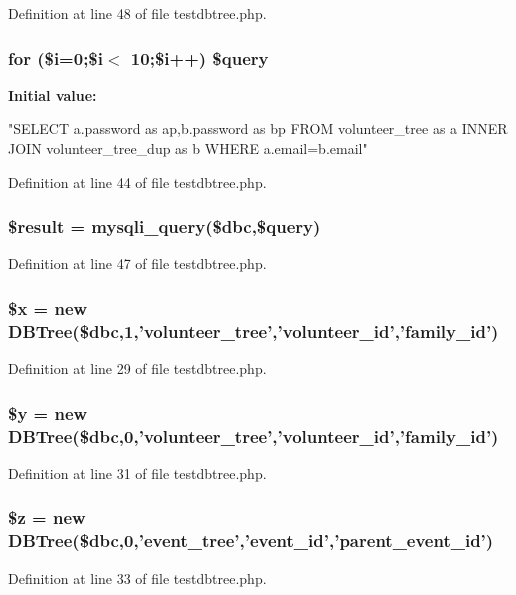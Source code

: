 Definition at line 48 of file testdbtree.php.
\subsubsection[{\$query}]{\setlength{\rightskip}{0pt plus 5cm}for (\$i=0;\$i$<$ 10;\$i++) \$query}\label{testdbtree_8php_a2343c53a5a5d6adb508c19a480d76bf1}
{\bfseries Initial value:}
\begin{DoxyCode}
"SELECT a.password as ap,b.password as bp FROM
            volunteer_tree as a INNER JOIN volunteer_tree_dup as b
            WHERE a.email=b.email"
\end{DoxyCode}


Definition at line 44 of file testdbtree.php.
\subsubsection[{\$result}]{\setlength{\rightskip}{0pt plus 5cm}\$result = mysqli\_\-query(\$dbc,\$query)}\label{testdbtree_8php_a112ef069ddc0454086e3d1e6d8d55d07}


Definition at line 47 of file testdbtree.php.
\subsubsection[{\$x}]{\setlength{\rightskip}{0pt plus 5cm}\$x = new {\bf DBTree}(\$dbc,1,'volunteer\_\-tree','volunteer\_\-id','family\_\-id')}\label{testdbtree_8php_af3a16c5f0dd7a74cf9acf6a49fff73a7}


Definition at line 29 of file testdbtree.php.
\subsubsection[{\$y}]{\setlength{\rightskip}{0pt plus 5cm}\$y = new {\bf DBTree}(\$dbc,0,'volunteer\_\-tree','volunteer\_\-id','family\_\-id')}\label{testdbtree_8php_a77b973d137fb33212e018b042df6e3e7}


Definition at line 31 of file testdbtree.php.
\subsubsection[{\$z}]{\setlength{\rightskip}{0pt plus 5cm}\$z = new {\bf DBTree}(\$dbc,0,'event\_\-tree','event\_\-id','parent\_\-event\_\-id')}\label{testdbtree_8php_a7359f3ea32073ea20d3176243cb5f86d}


Definition at line 33 of file testdbtree.php.
